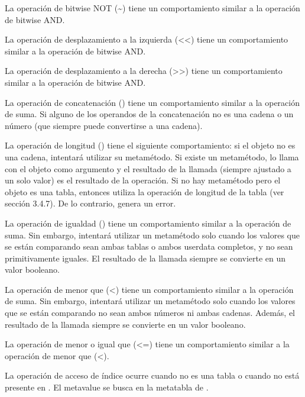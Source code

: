\begin{description}
	 La operación de bitwise NOT (\textasciitilde) tiene un comportamiento similar a la operación de bitwise AND.

	 La operación de desplazamiento a la izquierda (\textless\textless) tiene un comportamiento similar a la operación de bitwise AND.

	 La operación de desplazamiento a la derecha (\textgreater\textgreater) tiene un comportamiento similar a la operación de bitwise AND.

	 La operación de concatenación () tiene un comportamiento similar a la operación de suma. Si alguno de los operandos de la concatenación no es una cadena o un número (que siempre puede convertirse a una cadena).

	 La operación de longitud (\texthigh{\#}) tiene el siguiente comportamiento: si el objeto no es una cadena,  intentará utilizar su metamétodo. Si existe un metamétodo,  lo llama con el objeto como argumento y el resultado de la llamada (siempre ajustado a un solo valor) es el resultado de la operación. Si no hay metamétodo pero el objeto es una tabla, entonces  utiliza la operación de longitud de la tabla (ver sección 3.4.7). De lo contrario,  genera un error.

	 La operación de igualdad (\texthigh{==}) tiene un comportamiento similar a la operación de suma. Sin embargo,  intentará utilizar un metamétodo solo cuando los valores que se están comparando sean ambas tablas o ambos userdata completos, y no sean primitivamente iguales. El resultado de la llamada siempre se convierte en un valor booleano.

	 La operación de menor que (\textless) tiene un comportamiento similar a la operación de suma. Sin embargo,  intentará utilizar un metamétodo solo cuando los valores que se están comparando no sean ambos números ni ambas cadenas. Además, el resultado de la llamada siempre se convierte en un valor booleano.

	 La operación de menor o igual que (\textless=) tiene un comportamiento similar a la operación de menor que (\textless).

	 La operación de acceso de índice  ocurre cuando  no es una tabla o cuando  no está presente en . El metavalue se busca en la metatabla de .


\end{description}
